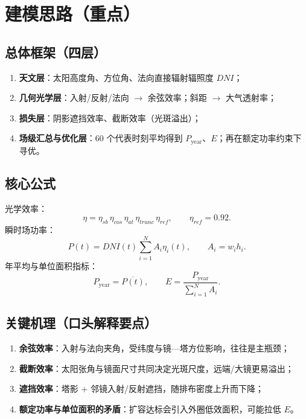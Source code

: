 \documentclass[12pt,a4paper]{ctexart}
\begin{document}
\section{建模思路（重点）}
\subsection{总体框架（四层）}
\begin{enumerate}
  \item \textbf{天文层}：太阳高度角、方位角、法向直接辐射辐照度 $DNI$；
  \item \textbf{几何光学层}：入射/反射/法向 $\rightarrow$ 余弦效率；斜距 $\rightarrow$ 大气透射率；
  \item \textbf{损失层}：阴影遮挡效率、截断效率（光斑溢出）；
  \item \textbf{场级汇总与优化层}：$60$ 个代表时刻平均得到 $P_{\mathrm{year}}$、$E$；再在额定功率约束下寻优。
\end{enumerate}

\subsection{核心公式}
光学效率：
\begin{equation}
\eta=\eta_{sb}\,\eta_{cos}\,\eta_{at}\,\eta_{trunc}\,\eta_{ref},\qquad \eta_{ref}=0.92.
\end{equation}
瞬时场功率：
\begin{equation}
P(t)=DNI(t)\sum_{i=1}^{N} A_i\eta_i(t),\qquad A_i=w_ih_i.
\end{equation}
年平均与单位面积指标：
\begin{equation}
P_{\mathrm{year}}=\overline{P(t)},\qquad
E=\frac{P_{\mathrm{year}}}{\sum_{i=1}^{N}A_i}.
\end{equation}

\subsection{关键机理（口头解释要点）}
\begin{enumerate}
  \item \textbf{余弦效率}：入射与法向夹角，受纬度与镜—塔方位影响，往往是主瓶颈；
  \item \textbf{截断效率}：太阳张角与镜面尺寸共同决定光斑尺度，远端/大镜更易溢出；
  \item \textbf{遮挡效率}：塔影 + 邻镜入射/反射遮挡，随排布密度上升而下降；
  \item \textbf{额定功率与单位面积的矛盾}：扩容达标会引入外圈低效面积，可能拉低 $E$。
\end{enumerate}
\end{document}
